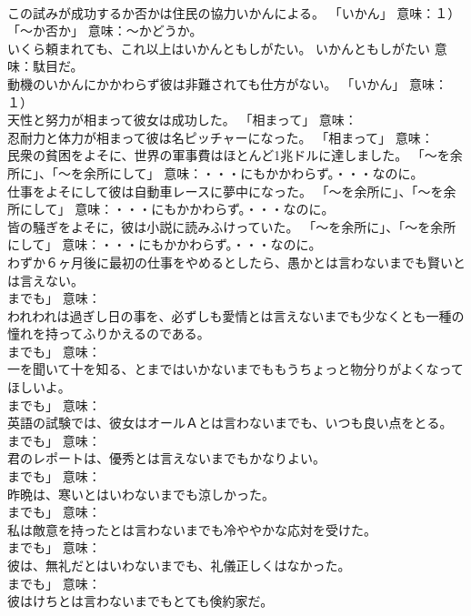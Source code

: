 \documentclass[8pt]{extreport}
\begin{document}
\begin{CJK}{UTF8}{min}
\\	この試みが成功するか否かは住民の協力いかんによる。	「いかん」 意味：１）
\\	「～か否か」 意味：～かどうか。	
\\	いくら頼まれても、これ以上はいかんともしがたい。	いかんともしがたい 意味：駄目だ。	
\\	動機のいかんにかかわらず彼は非難されても仕方がない。	「いかん」 意味：１）
\\	天性と努力が相まって彼女は成功した。	「相まって」 意味：
\\	忍耐力と体力が相まって彼は名ピッチャーになった。	「相まって」 意味：
\\	民衆の貧困をよそに、世界の軍事費はほとんど1兆ドルに達しました。	「～を余所に」、「～を余所にして」 意味：・・・にもかかわらず。・・・なのに。	
\\	仕事をよそにして彼は自動車レースに夢中になった。	「～を余所に」、「～を余所にして」 意味：・・・にもかかわらず。・・・なのに。	
\\	皆の騒ぎをよそに，彼は小説に読みふけっていた。	「～を余所に」、「～を余所にして」 意味：・・・にもかかわらず。・・・なのに。	
\\	わずか６ヶ月後に最初の仕事をやめるとしたら、愚かとは言わないまでも賢いとは言えない。	
\\	までも」 意味：
\\	われわれは過ぎし日の事を、必ずしも愛情とは言えないまでも少なくとも一種の憧れを持ってふりかえるのである。	
\\	までも」 意味：
\\	一を聞いて十を知る、とまではいかないまでももうちょっと物分りがよくなってほしいよ。	
\\	までも」 意味：
\\	英語の試験では、彼女はオールＡとは言わないまでも、いつも良い点をとる。	
\\	までも」 意味：
\\	君のレポートは、優秀とは言えないまでもかなりよい。	
\\	までも」 意味：
\\	昨晩は、寒いとはいわないまでも涼しかった。	
\\	までも」 意味：
\\	私は敵意を持ったとは言わないまでも冷ややかな応対を受けた。	
\\	までも」 意味：
\\	彼は、無礼だとはいわないまでも、礼儀正しくはなかった。	
\\	までも」 意味：
\\	彼はけちとは言わないまでもとても倹約家だ。	

\end{CJK}
\end{document}
